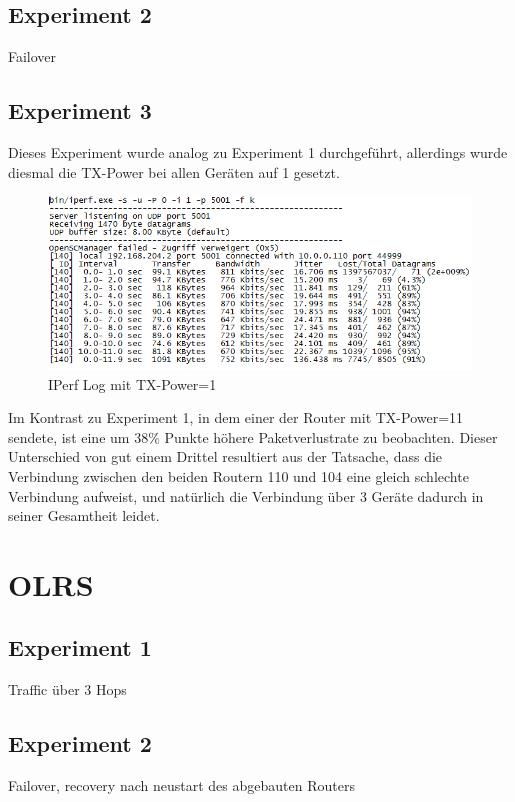 \documentclass[10pt]{scrartcl}
\begin{document}
	\subsection{Experiment 2}
	Failover	
	
	\subsection{Experiment 3}
	Dieses Experiment wurde analog zu Experiment 1 durchgeführt, allerdings wurde diesmal die TX-Power bei allen Geräten auf 1 gesetzt.
	\begin{figure}[H]
        \centering
                \includegraphics[width=\textwidth]{img/Babel_TX1_Protokoll}
        \caption{IPerf Log mit TX-Power=1}
        \label{img:babel_iperf_tx1}
	\end{figure}
	
	Im Kontrast zu Experiment 1, in dem einer der Router mit TX-Power=11 sendete, ist eine um 38\% Punkte höhere Paketverlustrate zu beobachten. Dieser Unterschied von gut einem Drittel resultiert aus der Tatsache, dass die Verbindung zwischen den beiden Routern 110 und 104 eine gleich schlechte Verbindung aufweist, und natürlich die Verbindung über 3 Geräte dadurch in seiner Gesamtheit leidet.

\section{OLRS}
	\subsection{Experiment 1}
	Traffic über 3 Hops	
	
	\subsection{Experiment 2}
	Failover, recovery nach neustart des abgebauten Routers
\end{document}
